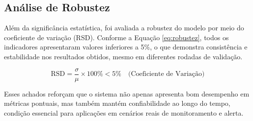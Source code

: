 \subsection{Análise de Robustez}

Além da significância estatística, foi avaliada a robustez do modelo por meio do coeficiente de variação (RSD). Conforme a Equação \ref{eq:robustez}, todos os indicadores apresentaram valores inferiores a 5\%, o que demonstra consistência e estabilidade nos resultados obtidos, mesmo em diferentes rodadas de validação.

\begin{equation}
\text{RSD} = \frac{\sigma}{\mu} \times 100\% < 5\% \quad \text{(Coeficiente de Variação)}
\label{eq:robustez}
\end{equation}

Esses achados reforçam que o sistema não apenas apresenta bom desempenho em métricas pontuais, mas também mantém confiabilidade ao longo do tempo, condição essencial para aplicações em cenários reais de monitoramento e alerta.
